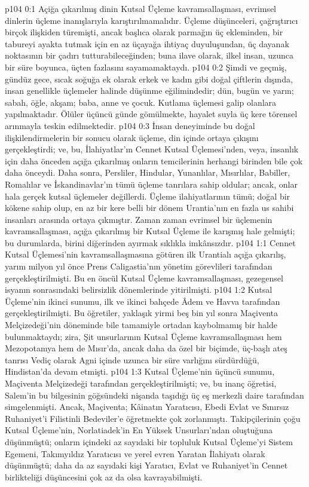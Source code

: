 \vs p104 0:1 Açiğa çıkarılmış dinin Kutsal Üçleme kavramsallaşması, evrimsel dinlerin üçleme inanışlarıyla karıştırılmamalıdır. Üçleme düşünceleri, çağrıştırıcı birçok ilişkiden türemişti, ancak başlıca olarak parmağın üç ekleminden, bir tabureyi ayakta tutmak için en az üçayağa ihtiyaç duyuluşundan, üç dayanak noktasının bir çadırı tutturabileceğinden; buna ilave olarak, ilkel insan, uzunca bir süre boyunca, üçten fazlasını sayamamaktaydı.
\vs p104 0:2 Şimdi ve geçmiş, gündüz gece, sıcak soğuğa ek olarak erkek ve kadın gibi doğal çiftlerin dışında, insan genellikle üçlemeler halinde düşünme eğilimindedir; dün, bugün ve yarın; sabah, öğle, akşam; baba, anne ve çocuk. Kutlama üçlemesi galip olanlara yapılmaktadır. Ölüler üçüncü günde gömülmekte, hayalet suyla üç kere törensel arınmayla teskin edilmektedir.
\vs p104 0:3 İnsan deneyiminde bu doğal ilişkilendirmelerin bir sonucu olarak üçleme, din içinde ortaya çıkışını gerçekleştirdi; ve, bu, İlahiyatlar’ın Cennet Kutsal Üçlemesi’nden, veya, insanlık için daha önceden açığa çıkarılmış onların temcilerinin herhangi birinden bile çok daha önceydi. Daha sonra, Persliler, Hindular, Yunanlılar, Mısırlılar, Babiller, Romalılar ve İskandinavlar’ın tümü üçleme tanrılara sahip oldular; ancak, onlar hala gerçek kutsal üçlemeler değillerdi. Üçleme ilahiyatlarının tümü; doğal bir kökene sahip olup, en az bir kere belli bir dönem Urantia’nın en fazla us sahibi insanları arasında ortaya çıkmıştır. Zaman zaman evrimsel bir üçlemenin kavramsallaşması, açığa çıkarılmış bir Kutsal Üçleme ile karışmış hale gelmişti; bu durumlarda, birini diğerinden ayırmak sıklıkla imkânsızdır.
\vs p104 1:1 Cennet Kutsal Üçlemesi’nin kavramsallaşmasına götüren ilk Urantialı açığa çıkarılış, yarım milyon yıl önce Prens Caligastia’nın yönetim görevlileri tarafından gerçekleştirilmişti. Bu en öncül Kutsal Üçleme kavramsallaşması, gezegensel isyanın sonrasındaki belirsizlik dönemlerinde yitirilmişti.
\vs p104 1:2 Kutsal Üçleme’nin ikinci sunumu, ilk ve ikinci bahçede Âdem ve Havva tarafından gerçekleştirilmişti. Bu öğretiler, yaklaşık yirmi beş bin yıl sonra Maçiventa Melçizedeği’nin döneminde bile tamamiyle ortadan kaybolmamış bir halde bulunmaktaydı; zira, Şit unsurlarının Kutsal Üçleme kavramsallaşması hem Mezopotamya hem de Mısır’da, ancak daha da özel bir biçimde, üç\hyp{}başlı ateş tanrısı Vediç olarak Agni içinde uzunca bir süre varlığını sürdürdüğü, Hindistan’da devam etmişti.
\vs p104 1:3 Kutsal Üçleme’nin üçüncü sunumu, Maçiventa Melçizedeği tarafından gerçekleştirilmişti; ve, bu inanç öğretisi, Salem’in bu bilgesinin göğsündeki nişanda taşıdığı üç eş merkezli daire tarafından simgelenmişti. Ancak, Maçiventa; Kâinatın Yaratıcısı, Ebedi Evlat ve Sınırsız Ruhaniyet’i Filistinli Bedeviler’e öğretmekte çok zorlanmıştı. Takipçilerinin çoğu Kutsal Üçleme’nin, Norlatiadek’in En Yüksek Unsurları’ndan oluştuğuna düşünmüştü; onların içindeki az sayıdaki bir topluluk Kutsal Üçleme’yi Sistem Egemeni, Takımyıldız Yaratıcısı ve yerel evren Yaratan İlahiyatı olarak düşünmüştü; daha da az sayıdaki kişi Yaratıcı, Evlat ve Ruhaniyet’in Cennet birlikteliği düşüncesini çok az da olsa kavrayabilmişti.
